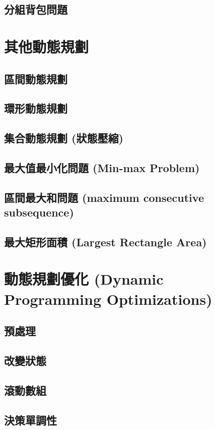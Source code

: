 \documentclass[12pt,a4paper,oneside]{report}
\begin{document}
\begin{CJK}{UTF8}{bkai}
\subsection{分組背包問題}

\section{其他動態規劃}

\subsection{區間動態規劃}
\subsection{環形動態規劃}
\subsection{集合動態規劃 (狀態壓縮)}
\subsection{最大值最小化問題 (Min-max Problem)}
\subsection{區間最大和問題 (maximum consecutive subsequence)}
\subsection{最大矩形面積 (Largest Rectangle Area)}

\section{動態規劃優化 (Dynamic Programming Optimizations)}

\subsection{預處理}
\subsection{改變狀態}
\subsection{滾動數組}
\subsection{決策單調性}

\end{CJK}
\end{document}

